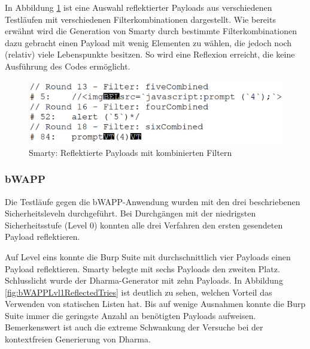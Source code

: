 \FloatBarrier
In Abbildung \ref{fig:BadWAFReflectedResultsCombined} ist eine Auswahl reflektierter Payloads aus verschiedenen Testläufen mit verschiedenen Filterkombinationen dargestellt. Wie bereits erwähnt wird die Generation von Smarty durch bestimmte Filterkombinationen dazu gebracht einen Payload mit wenig Elementen zu wählen, die jedoch noch (relativ) viele Lebenspunkte besitzen. So wird eine Reflexion erreicht, die keine Ausführung des Codes ermöglicht.

\begin{figure}[htbp] 
	\centering
	\includegraphics[width=\textwidth]{contents/images/BadWAFReflectedResultsCombined}
	\caption{Smarty: Reflektierte Payloads mit kombinierten Filtern}
	\label{fig:BadWAFReflectedResultsCombined}
\end{figure}


\FloatBarrier

\subsubsection{bWAPP}

Die Testläufe gegen die bWAPP-Anwendung wurden mit den drei beschriebenen Sicherheitsleveln durchgeführt. Bei Durchgängen mit der niedrigsten Sicherheitsstufe (Level 0) konnten alle drei Verfahren den ersten gesendeten Payload reflektieren.

Auf Level eins konnte die Burp Suite mit durchschnittlich vier Payloads einen Payload reflektieren. Smarty belegte mit sechs Payloads den zweiten Platz. Schlusslicht wurde der Dharma-Generator mit zehn Payloads. In Abbildung \ref{fig:bWAPPLvl1ReflectedTries} ist deutlich zu sehen, welchen Vorteil das Verwenden von statischen Listen hat. Bis auf wenige Ausnahmen konnte die Burp Suite immer die geringste Anzahl an benötigten Payloads aufweisen. Bemerkenswert ist auch die extreme Schwankung der Versuche bei der kontextfreien Generierung von Dharma.
 

